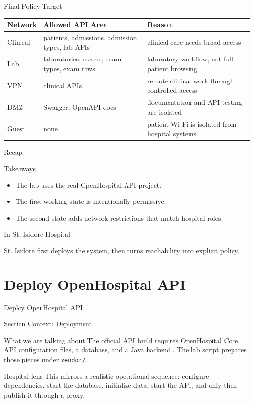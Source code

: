 \documentclass[presentation]{beamer}
\newcommand{\sectiontitleframe}[1]{
\begin{frame}[plain,c]
\begin{center}
{\usebeamerfont{title}\usebeamercolor[fg]{title}#1}
\end{center}
\end{frame}
}
\newcommand{\scenario}{St. Isidore Hospital}
\newcommand{\takeawaysframe}[2]{
\begin{frame}[c]{Recap: \insertsection}
\begin{block}{Takeaways}
#1
\end{block}
\begin{exampleblock}{In \scenario}
#2
\end{exampleblock}
\end{frame}
}
\begin{document}
\begin{frame}[c]{Final Policy Target}
\small
\begin{tabularx}{\textwidth}{@{}p{}p{}X@{}}
\toprule
\textbf{Network} & \textbf{Allowed API Area} & \textbf{Reason} \\
\midrule
Clinical & patients, admissions, admission types, lab APIs & clinical care needs broad access \\
Lab & laboratories, exams, exam types, exam rows & laboratory workflow, not full patient browsing \\
VPN & clinical APIs & remote clinical work through controlled access \\
DMZ & Swagger, OpenAPI docs & documentation and API testing are isolated \\
Guest & none & patient Wi-Fi is isolated from hospital systems \\
\bottomrule
\end{tabularx}
\end{frame}

\takeawaysframe{
\begin{itemize}
    \item The lab uses the real OpenHospital API project.
    \item The first working state is intentionally permissive.
    \item The second state adds network restrictions that match hospital roles.
\end{itemize}
}{
St. Isidore first deploys the system, then turns reachability into explicit policy.
}

\section{Deploy OpenHospital API}
\sectiontitleframe{Deploy OpenHospital API}

\begin{frame}[c]{Section Context: Deployment}
\begin{block}{What we are talking about}
The official API build requires OpenHospital Core, API configuration files, a database, and a Java
backend \cite{openhospital_api}. The lab script prepares those pieces under \texttt{vendor/}.
\end{block}

\begin{exampleblock}{Hospital lens}
This mirrors a realistic operational sequence: configure dependencies, start the database, initialize
data, start the API, and only then publish it through a proxy.
\end{exampleblock}
\end{frame}
\end{document}
